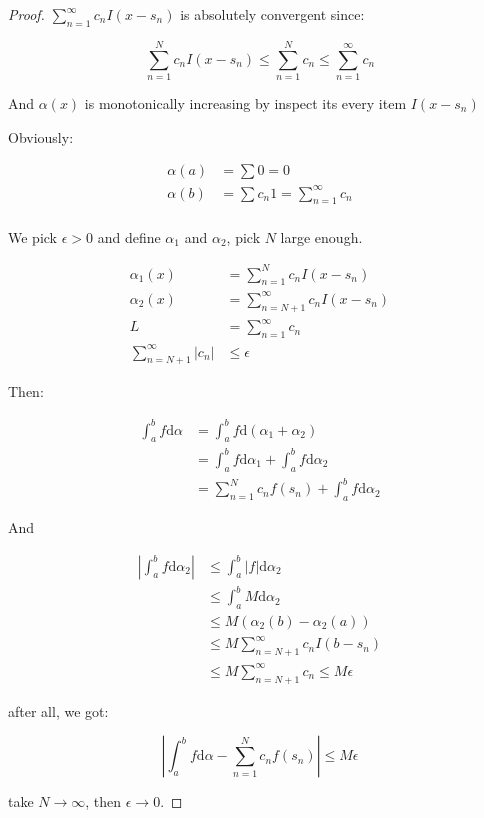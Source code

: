 \begin{proof}
    $\sum_{n=1}^{\infty}c_nI(x-s_n)$ is absolutely convergent since:

    \[
        \sum_{n=1}^{N}c_nI(x-s_n) \le \sum_{n=1}^{N}c_n \le \sum_{n=1}^{\infty}c_n
    \]

    And $\alpha(x)$ is monotonically increasing by inspect its every item $I(x-s_n)$

    Obviously:

    \begin{align*}
        \alpha(a) &= \sum 0 = 0 \\
        \alpha(b) &= \sum c_n 1 = \sum_{n=1}^{\infty}c_n \\
    \end{align*}

    We pick $\epsilon > 0$ and define $\alpha_1$ and $\alpha_2$, pick $N$ large enough.

    \begin{align*}
        \alpha_1 (x) &= \sum_{n=1}^{N}c_nI(x-s_n) \\
        \alpha_2 (x) &= \sum_{n=N+1}^{\infty}c_nI(x-s_n) \\
        L &= \sum_{n=1}^{\infty}c_n \\
    \sum_{n=N+1}^{\infty}\left| c_n \right| & \le \epsilon
    \end{align*}

    Then:

    \begin{align*}
        \int_a^b f \mathrm{d} \alpha &= \int_a^b f \mathrm{d} \left( \alpha_1 + \alpha_2 \right) \\
        &= \int_a^b f \mathrm{d} \alpha_1 + \int_a^b f \mathrm{d} \alpha_2 \\
        &= \sum_{n=1}^{N}c_nf(s_n) + \int_a^b f \mathrm{d} \alpha_2
    \end{align*}

    And

    \begin{align*}
        \left| \int_a^b f \mathrm{d} \alpha_2 \right| &\le \int_a^b |f| \mathrm{d} \alpha_2  \\
        & \le \int_a^b M \mathrm{d} \alpha_2 \\
        & \le M(\alpha_2(b) - \alpha_2(a)) \\
        & \le M \sum_{n=N+1}^{\infty}c_nI(b-s_n) \\
        & \le M \sum_{n=N+1}^{\infty}c_n \le M \epsilon
    \end{align*}

    after all, we got:

    \[
        \left| \int_a^b f \mathrm{d} \alpha - \sum_{n=1}^{N}c_nf(s_n) \right| \le M \epsilon
    \]

    take $N \to \infty$, then $\epsilon \to 0$.
\end{proof}


